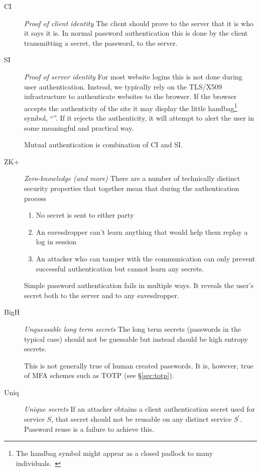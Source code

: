 \documentclass[12pt]{article}
\newcommand{\propdescription}[1]{\textit{#1}\newline}
\newcommand{\prop}[1]{\textsf{#1}}
\begin{document}
\begin{description}
  \item[CI] \propdescription{Proof of client identity}
    The client should prove to the server that it is who it says it is.
    In normal password authentication this is done by the client transmitting a secret, the password, to the server.

  \item[SI] \propdescription{Proof of server identity}
    For most website logins this is not done during user authentication.
    Instead, we typically rely on the TLS/X509 infrastructure to authenticate websites to the browser. If the browser accepts the authenticity of the site it may display the little handbag\footnote{The handbag symbol might appear as a closed padlock to many individuals.~\cite{felt2016rethinking}} symbol, “{\color{padlockcolor}\small\faLock}”.
	If it rejects the authenticity, it will attempt to alert the user in some meaningful and practical way.
	 
    Mutual authentication is combination of \prop{CI} and \prop{SI}.

  \item[ZK+] \propdescription{Zero-knowledge (and more)} 
  There are a number of technically distinct security properties that together mean that during the authentication process
  \begin{enumerate}
	  \item No secret is sent to either party
	  \item An eavesdropper can't learn anything that would help them replay a log in session
	  \item An attacker who can tamper with the communication can only prevent successful authentication but cannot learn any secrets.
	  \end{enumerate}
  
  Simple password authentication fails in multiple ways. It reveals the user's secret both to the server and to any eavesdropper.
   
  
  \item[BigH] \propdescription{Unguessable long term secrets}
    The long term secrets (passwords in the typical case) should not be guessable
    but instead should be high entropy secrets.
	
	This is not generally true of human created passwords.
    It is, however, true of MFA schemes such as TOTP (see \S\ref{sec:totp}).

  \item[Uniq] \propdescription{Unique secrets}
    If an attacker obtains a client authentication secret used for service $S$, 
    that secret should not be reusable on any distinct service $S^\prime$.
    Password reuse is a failure to achieve this. 


\end{description}
\end{document}

